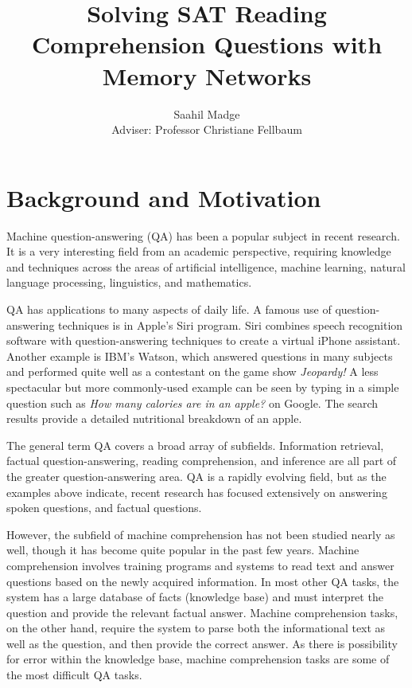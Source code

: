 \documentclass[pageno]{jpaper}
\begin{document}
\title{
Solving SAT Reading Comprehension Questions with Memory Networks}

\author{Saahil Madge\\Adviser: Professor Christiane Fellbaum}

\date{}
\maketitle

\thispagestyle{empty}

\section{Background and Motivation}
\label{Background and Motivation}

Machine question-answering (QA) has been a popular subject in recent research.
It is a very interesting field from an academic perspective, requiring
knowledge and techniques across the areas of artificial intelligence, machine
learning, natural language processing, linguistics, and mathematics.

QA has applications to many aspects of daily life. A famous use of
question-answering techniques is in Apple's Siri program. Siri combines speech
recognition software with question-answering techniques to create a virtual
iPhone assistant. Another example is IBM's Watson, which answered questions in
many subjects and performed quite well as a contestant on the game show
\textit{Jeopardy!} A less spectacular but more commonly-used example can be seen
by typing in a simple question such as \textit{How many calories are in an
apple?} on Google. The search results provide a detailed nutritional breakdown
of an apple.

The general term QA covers a broad array of subfields. Information retrieval,
factual question-answering, reading comprehension, and inference are all part
of the greater question-answering area. QA is a rapidly evolving field, but as
the examples above indicate, recent research has focused extensively on
answering spoken questions, and factual questions.

However, the subfield of machine comprehension has not been studied nearly as
well, though it has become quite popular in the past few years. Machine
comprehension involves training programs and systems to read text and answer
questions based on the newly acquired information. In most other QA tasks, the
system has a large database of facts (knowledge base) and must interpret the
question and provide the relevant factual answer. Machine comprehension tasks,
on the other hand, require the system to parse both the informational text as
well as the question, and then provide the correct answer. As there is
possibility for error within the knowledge base, machine comprehension tasks
are some of the most difficult QA tasks.
\end{document}
